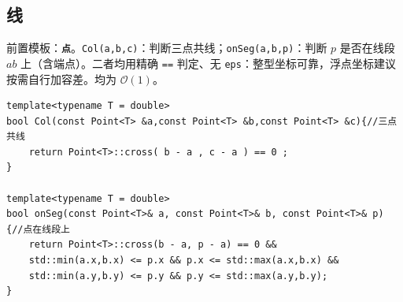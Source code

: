 \subsection{线}

前置模板：\textbf{\texttt{点}}。\verb|Col(a,b,c)|：判断三点共线；\verb|onSeg(a,b,p)|：判断 $p$ 是否在线段 $ab$ 上（含端点）。二者均用精确 \texttt{==} 判定、无 \texttt{eps}：整型坐标可靠，浮点坐标建议按需自行加容差。均为 $\mathcal{O}(1)$。

\begin{lstlisting}
template<typename T = double>
bool Col(const Point<T> &a,const Point<T> &b,const Point<T> &c){//三点共线
    return Point<T>::cross( b - a , c - a ) == 0 ;
}

template<typename T = double>
bool onSeg(const Point<T>& a, const Point<T>& b, const Point<T>& p) {//点在线段上
    return Point<T>::cross(b - a, p - a) == 0 &&
    std::min(a.x,b.x) <= p.x && p.x <= std::max(a.x,b.x) &&
    std::min(a.y,b.y) <= p.y && p.y <= std::max(a.y,b.y);
}
\end{lstlisting}
